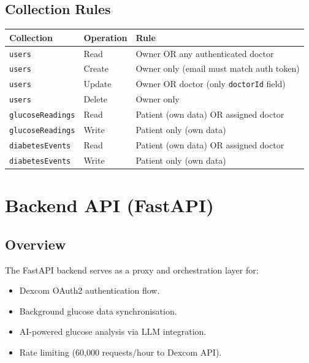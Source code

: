 \documentclass[12pt,a4paper]{article}
\begin{document}
\subsection{Collection Rules}

\begin{longtable}{p{3.5cm} p{2cm} p{8.5cm}}
\toprule
\textbf{Collection} & \textbf{Operation} & \textbf{Rule} \\
\midrule
\endhead
\texttt{users} & Read & Owner OR any authenticated doctor \\
\texttt{users} & Create & Owner only (email must match auth token) \\
\texttt{users} & Update & Owner OR doctor (only \texttt{doctorId} field) \\
\texttt{users} & Delete & Owner only \\
\midrule
\texttt{glucoseReadings} & Read & Patient (own data) OR assigned doctor \\
\texttt{glucoseReadings} & Write & Patient only (own data) \\
\midrule
\texttt{diabetesEvents} & Read & Patient (own data) OR assigned doctor \\
\texttt{diabetesEvents} & Write & Patient only (own data) \\
\bottomrule
\end{longtable}

\section{Backend API (FastAPI)}

\subsection{Overview}

The FastAPI backend serves as a proxy and orchestration layer for:
\begin{itemize}
    \item Dexcom OAuth2 authentication flow.
    \item Background glucose data synchronisation.
    \item AI-powered glucose analysis via LLM integration.
    \item Rate limiting (60,000 requests/hour to Dexcom API).
\end{itemize}
\end{document}
